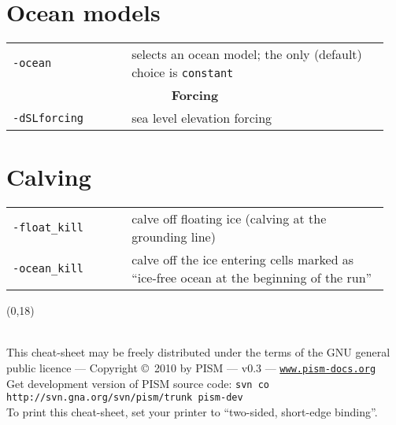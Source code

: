 \documentclass[landscape]{article}
\newcommand{\PISMDOWNLOADMSG}{Get development version of PISM source code: \texttt{svn co http://svn.gna.org/svn/pism/trunk pism-dev}}
\newcommand{\tabletitle}[1]{\multicolumn{2}{c}{\textbf{#1}}}
\begin{document}
\begin{textblock}{15}
\section{Ocean models}
\label{sec:ocean-models}

\begin{tabular}{@{}p{0.3\linewidth}p{0.65\linewidth}@{}}
\texttt{-ocean} & selects an ocean model; the only (default) choice is
\texttt{constant} \\
\tabletitle{Forcing} \\
\texttt{-dSLforcing} & sea level elevation forcing\\
\end{tabular}

\section{Calving}
\label{sec:calving}
\begin{tabular}{@{}p{0.3\linewidth}p{0.65\linewidth}@{}}
  \texttt{-float_kill} & calve off floating ice (calving at the grounding
  line)\\
\texttt{-ocean_kill} & calve off the ice entering cells marked as ``ice-free
ocean at the beginning of the run''
\end{tabular}

\end{textblock}

\null\newpage
\begin{textblock}{47}(0,18)
  \begin{center}
    \hrulefill\\
    This cheat-sheet may be freely distributed under the terms of the GNU general
    public licence --- Copyright \copyright\ 2010 by PISM --- v0.3 ---
    \href{http://www.pism-docs.org}{\texttt{www.pism-docs.org}}\\
    \PISMDOWNLOADMSG\\
    To print this cheat-sheet, set your printer to ``two-sided, short-edge binding''.
 \end{center}
\end{textblock}
\end{document}
